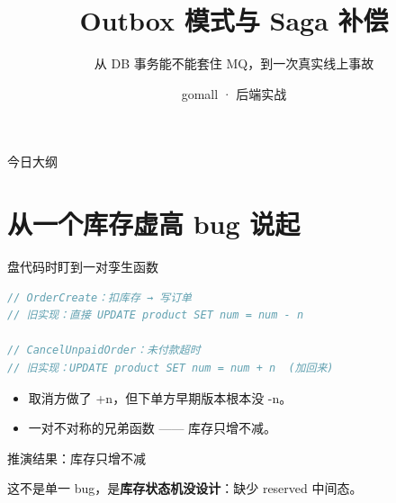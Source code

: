 

\title{Outbox 模式与 Saga 补偿}
\subtitle{从 DB 事务能不能套住 MQ，到一次真实线上事故}
\author{gomall · 后端实战}
\date{}



\maketitle

\begin{frame}{今日大纲}
\tableofcontents
\end{frame}

\section{从一个库存虚高 bug 说起}

\begin{frame}[fragile]{盘代码时盯到一对孪生函数}
\begin{lstlisting}[language=Go,basicstyle=\ttfamily\scriptsize]
// OrderCreate：扣库存 → 写订单
// 旧实现：直接 UPDATE product SET num = num - n

// CancelUnpaidOrder：未付款超时
// 旧实现：UPDATE product SET num = num + n  (加回来)
\end{lstlisting}
\vspace{2mm}
\begin{itemize}
  \item 取消方做了 +n，但下单方早期版本根本没 -n。
  \item 一对不对称的兄弟函数 —— 库存只增不减。
\end{itemize}
\end{frame}

\begin{frame}{推演结果：库存只增不减}
\vspace{2mm}
\small 这不是单一 bug，是\textbf{库存状态机没设计}：缺少 reserved 中间态。
\end{frame}

